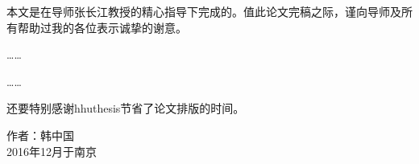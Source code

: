 
\begin{acknowledgement}

本文是在导师张长江教授的精心指导下完成的。值此论文完稿之际，谨向导师及所有帮助过我的各位表示诚挚的谢意。\par
……\par
……\par
还要特别感谢hhuthesis节省了论文排版的时间。
\vspace{5cm}
\begin{flushright}
	作者：韩中国\\
	2016年12月于南京
\end{flushright}

\end{acknowledgement}
